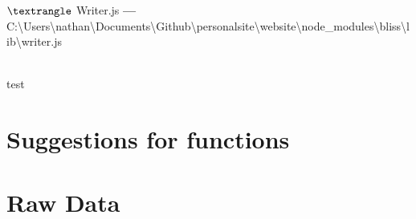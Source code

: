 \documentclass{report}[10pt]
\newcommand{\fileLocation}[2]{$\textrangle$ #1 \textbf{---} #2}
\begin{document}
\fileLocation{Writer.js}{C:\textbackslash Users\textbackslash nathan\textbackslash Documents\textbackslash Github\textbackslash personalsite\textbackslash website\textbackslash node\_modules\textbackslash bliss\textbackslash lib\textbackslash writer.js}\\\\

\hrulefill

{test}

\chapter{Suggestions for functions}

\chapter{Raw Data}
\end{document}
